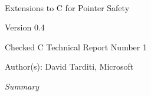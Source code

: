 \documentclass[11pt]{report}
\begin{document}
\begin{titlepage}
{\center
\mbox{ }\\
\vspace{2in}
{\huge Extensions to C for Pointer Safety \par}
{Version 0.4 \par}
\vspace{0.5in}
{Checked C Technical Report Number 1 \par}
\vspace{0.25in}
{Author(s): David Tarditi, Microsoft\par} 
\vspace{1in}
{\it Summary \par}

}
\end{titlepage}

\tableofcontents












%




\nocite{Jones2009}



\appendix
% 
% 
\end{document}
